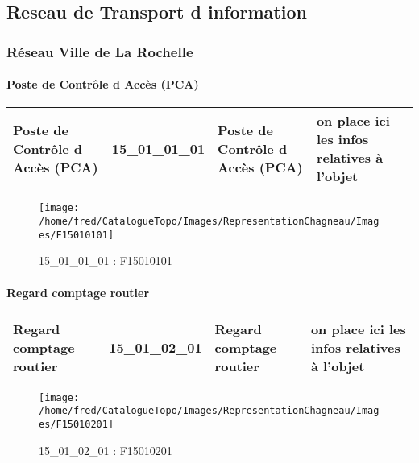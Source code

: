 \documentclass[12pt,titlepage,oneside]{book}
\begin{document}
\subsection{Reseau de Transport d information}
\subsubsection{\large Réseau Ville de La Rochelle}
\paragraph{Poste de Contrôle d Accès (PCA)}
\noindent
\vspace{\baselineskip}

\renewcommand{\arraystretch}{1.2}
\begin{supertabular}{|p{10cm}|c|p{13cm}|p{12cm}|}
 Poste de Contrôle d Accès (PCA) & 15\_01\_01\_01 & Poste de Contrôle d Accès (PCA) & on place ici les infos relatives à l'objet\\
\hline
\end{supertabular}
\begin{figure}[h!]
  \hfill         %
  \begin{minipage}[t]{3cm}
    \begin{center}
      \texttt{[image: /home/fred/CatalogueTopo/Images/RepresentationChagneau/Images/F15010101]}
      \caption[F15010101]{\label{} 15\_01\_01\_01 : F15010101}
    \end{center}
  \end{minipage}
\end{figure}


\paragraph{Regard comptage routier}
\noindent
\vspace{\baselineskip}

\renewcommand{\arraystretch}{1.2}
\begin{supertabular}{|p{10cm}|c|p{13cm}|p{12cm}|}
 Regard comptage routier & 15\_01\_02\_01 & Regard comptage routier & on place ici les infos relatives à l'objet\\
\hline
\end{supertabular}
\begin{figure}[h!]
  \hfill         %
  \begin{minipage}[t]{3cm}
    \begin{center}
      \texttt{[image: /home/fred/CatalogueTopo/Images/RepresentationChagneau/Images/F15010201]}
      \caption[F15010201]{\label{} 15\_01\_02\_01 : F15010201}
    \end{center}
  \end{minipage}
\end{figure}
\end{document}
